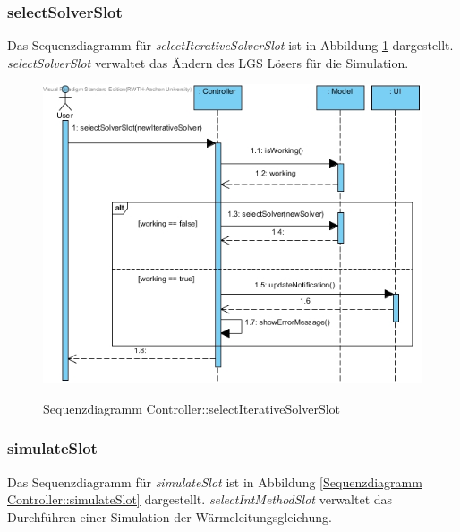 \subsubsection*{selectSolverSlot}

Das Sequenzdiagramm für \emph{selectIterativeSolverSlot} ist in Abbildung \ref{Sequenzdiagramm Controller::selectIterativeSolverSlot} dargestellt. \emph{selectSolverSlot} verwaltet das Ändern des LGS Lösers für die Simulation.

\begin{figure}[H]
	\centering
	\includegraphics[scale=.7]{Bilder/Controller__selectSolverSlot().jpg}\\
	\caption{Sequenzdiagramm Controller::selectIterativeSolverSlot}
	\label{Sequenzdiagramm Controller::selectIterativeSolverSlot}
\end{figure}

\subsubsection*{simulateSlot}

Das Sequenzdiagramm für \emph{simulateSlot} ist in Abbildung \ref{Sequenzdiagramm Controller::simulateSlot} dargestellt. \emph{selectIntMethodSlot} verwaltet das Durchführen einer Simulation der Wärmeleitungsgleichung.

